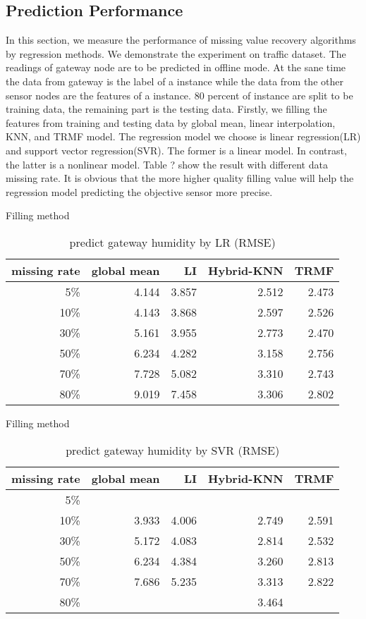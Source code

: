 \subsection{Prediction Performance}
In this section, we measure the performance of missing value recovery algorithms by regression methods.
We demonstrate the experiment on traffic dataset.
The readings of gateway node are to be predicted in offline mode.
At the sane time the data from gateway is the label of a instance while the data from the other sensor nodes are the features of a instance.
80 percent of instance are split to be training data, the remaining part is the testing data.
Firstly, we filling the features from training and testing data by global mean, linear interpolation, KNN, and TRMF model.
The regression model we choose is linear regression(LR) and support vector regression(SVR).
The former is a linear model.
In contrast, the latter is a nonlinear model.
Table ? show the result with different data missing rate.
It is obvious that the more higher quality filling value will help the regression model predicting the objective sensor more precise.

\begin{table} [htbp]
\centering
\caption{predict gateway humidity by LR (RMSE) }
\label{table: LR}
   Filling method
\begin{tabular}{ r | r r r r}
        missing rate&global mean     &LI   &Hybrid-KNN &TRMF\\ \hline
        5\%      &4.144&3.857&2.512&2.473\\
        10\%    &4.143&3.868& 2.597&2.526\\
        30\%    &5.161&3.955&2.773&2.470\\
        50\%    &6.234&4.282&3.158&2.756\\
        70\%   &7.728&5.082&3.310&2.743\\
        80\%   &9.019&7.458&3.306&2.802\\
\end{tabular}
\end{table}

\begin{table}[htbp]
\centering
\caption{predict gateway humidity by SVR (RMSE) }
\label{table: SVR}
   Filling method
\begin{tabular}{ r | r r r r}
        missing rate&global mean     &LI   &Hybrid-KNN &TRMF\\ \hline
        5\%&&&&\\
        10\%    &3.933 &4.006&2.749&2.591\\
        30\%    &5.172&4.083&2.814&2.532\\
        50\%    &6.234&4.384&3.260&2.813\\
        70\%   &7.686&5.235&3.313&2.822\\
           80\%  &&&3.464&\\
\end{tabular}
\end{table}
